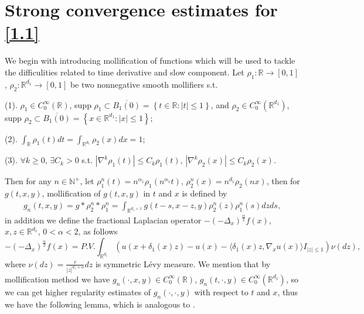 \documentclass[11pt,reqno]{amsart}
\numberwithin{equation}{section}
\begin{document}
\section{Strong convergence estimates for \ref{1.1}}\label{str-est}
We begin with introducing  mollification of functions which will be used to tackle the difficulities related to time derivative and slow component. Let $\rho_{1}:\mathbb{R}\rightarrow [0,1]$, $\rho_{2}: \mathbb{R}^{ d_{1}}\rightarrow [0,1]$ be two nonnegative smooth mollifiers s.t. 

(1). $\rho_{1}\in C_{0}^{\infty}(\mathbb{R})$, supp $  \rho_{1}\subset \overline{B_{1}(0)}=\left\lbrace t\in \mathbb{R}:|t|\leq 1 \right\rbrace $, and $ \rho_{2}\in C_{0}^{\infty}(\mathbb{R}^{ d_{1}})$, supp $  \rho_{2}\subset \overline{B_{1}(0)}=\left\lbrace x\in \mathbb{R}^{ d_{1}}:|x|\leq 1 \right\rbrace $;

(2). $\int_{\mathbb{R}}\rho_{1}(t)dt=\int_{\mathbb{R}^{ d_{1}}}\rho_{2}(x)dx=1$;

(3). $\forall k\geq 0$, $\exists C_{k}>0$ s.t. $|\nabla^{k}\rho_{1}(t)|\leq C_{k}\rho_{1}(t)$, $|\nabla^{k}\rho_{2}(x)|\leq C_{k}\rho_{2}(x)$.

Then for any $n\in  \mathbb{N}^{+}$, let $\rho_{1}^{n}(t)=n^{\alpha_{1}}\rho_{1}(n^{\alpha_{1}}t)$, $\rho_{2}^{n}(x)=n^{d_{1}}\rho_{2}(nx)$, then for $g(t,x,y)$, mollification of $g(t,x,y)$ in $t$ and $x$ is defined by
\begin{align}\label{mol}
	g_{n}(t,x,y)=g\ast\rho_{2}^{n}\ast\rho_{1}^{n}=\int_{\mathbb{R}^{ d_{1}+1}}g(t-s, x-z, y)\rho_{2}^{n}(z)\rho_{1}^{n}(s)dzds,
\end{align} 
in addition we define the fractional Laplacian operator  $-(-\Delta_{x})^{\frac{\alpha}{2}}f(x)$, $x,z\in \mathbb{R}^{d_{1}}$,  $0<\alpha<2$, as follows 
\begin{equation}\label{5.56-1}
	-(-\Delta_{x})^{\frac{\alpha}{2}}f(x)=P.V.\int_{\mathbb{R}^{d_{1}}}(u(x+\delta_{1}(x)z)-u(x)-\langle \delta_{1}(x)z,\nabla_{x}u(x)\rangle I_{|z|\leq1})\nu(dz),
\end{equation} 
where $\nu(dz)=\frac{c}{|z|^{d_{1}
		+\alpha}}dz$ is symmetric L\'{e}vy measure.
We mention that by mollification method we have $g_{n}(\cdot,x,y)\in  C_{0}^{\infty}(\mathbb{R})$, $g_{n}(t,\cdot,y)\in  C_{0}^{\infty}(\mathbb{R}^{ d_{1}})$, so we can get higher regularity estimates of $g_{n}(\cdot,\cdot,y)$ with respect to $t$ and $x$, thus we have the following lemma, which is analogous to \cite[Lemma 5.1]{KY}.
\end{document}
